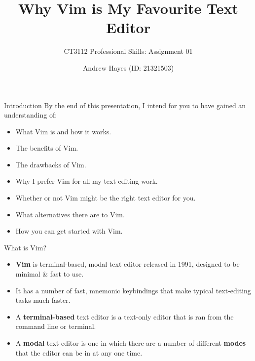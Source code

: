 \documentclass[]{beamer}
\author{Andrew Hayes (ID: 21321503)}
\title{Why Vim is My Favourite Text Editor}
\subtitle{CT3112 Professional Skills: Assignment 01}
\institute{University of Galway}
\begin{document}
\frame{\titlepage}

\begin{frame}{Introduction}
    By the end of this presentation, I intend for you to have gained an understanding of:
    \begin{itemize}
        \item   What Vim is and how it works.
        \item   The benefits of Vim.
        \item   The drawbacks of Vim.
        \item   Why I prefer Vim for all my text-editing work.
        \item   Whether or not Vim might be the right text editor for you.
        \item   What alternatives there are to Vim.
        \item   How you can get started with Vim.
    \end{itemize}
\end{frame}

\begin{frame}{What is Vim?}
    \begin{itemize}
        \item   \textbf{Vim} is terminal-based, modal text editor released in 1991, designed to be minimal \& fast to
                use.
        \item   It has a number of fast, mnemonic keybindings that make typical text-editing tasks much faster.
        \item   A \textbf{terminal-based} text editor is a text-only editor that is ran from the command line or
                terminal.
        \item   A \textbf{modal} text editor is one in which there are a number of different \textbf{modes} that the 
                editor can be in at any one time. 
    \end{itemize}
\end{frame}
\end{document}
